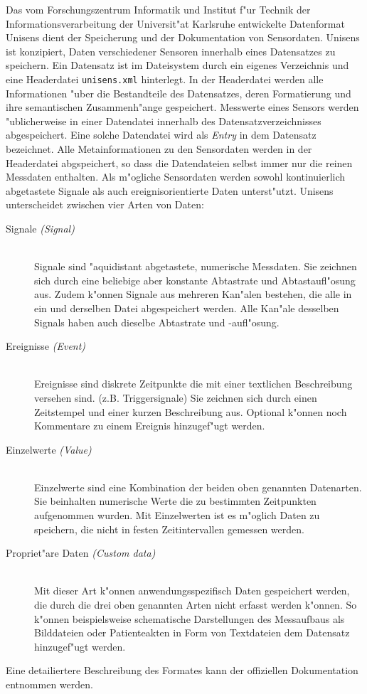 Das vom Forschungszentrum Informatik und Institut f"ur Technik der Informationsverarbeitung der Universit"at Karlsruhe entwickelte Datenformat Unisens dient der Speicherung und der Dokumentation von Sensordaten.
Unisens ist konzipiert, Daten verschiedener Sensoren innerhalb eines Datensatzes zu speichern.
Ein Datensatz ist im Dateisystem durch ein eigenes Verzeichnis und eine Headerdatei \verb|unisens.xml| hinterlegt.
In der Headerdatei werden alle Informationen "uber die Bestandteile des Datensatzes, deren Formatierung und ihre semantischen Zusammenh"ange gespeichert.
Messwerte eines Sensors werden "ublicherweise in einer Datendatei innerhalb des Datensatzverzeichnisses abgespeichert.
Eine solche Datendatei wird als \emph{Entry} in dem Datensatz bezeichnet.
Alle Metainformationen zu den Sensordaten werden in der Headerdatei abgspeichert, so dass die Datendateien selbst immer nur die reinen Messdaten enthalten.
Als m"ogliche Sensordaten werden sowohl kontinuierlich abgetastete Signale als auch ereignisorientierte Daten unterst"utzt.
Unisens unterscheidet zwischen vier Arten von Daten:
\begin{description}
	\item[Signale \emph{(Signal)}] \hfill \\
		Signale sind "aquidistant abgetastete, numerische Messdaten.
		Sie zeichnen sich durch eine beliebige aber konstante Abtastrate und Abtastaufl"osung aus.
		Zudem k"onnen Signale aus mehreren Kan"alen bestehen, die alle in ein und derselben Datei abgespeichert werden.
		Alle Kan"ale desselben Signals haben auch dieselbe Abtastrate und -aufl"osung.
	\item[Ereignisse \emph{(Event)}] \hfill \\
		Ereignisse sind diskrete Zeitpunkte die mit einer textlichen Beschreibung versehen sind. (z.B. Triggersignale)
		Sie zeichnen sich durch einen Zeitstempel und einer kurzen Beschreibung aus.
		Optional k"onnen noch Kommentare zu einem Ereignis hinzugef"ugt werden.
	\item[Einzelwerte \emph{(Value)}] \hfill \\
		Einzelwerte sind eine Kombination der beiden oben genannten Datenarten.
		Sie beinhalten numerische Werte die zu bestimmten Zeitpunkten aufgenommen wurden.
		Mit Einzelwerten ist es m"oglich Daten zu speichern, die nicht in festen Zeitintervallen gemessen werden.
	\item[Propriet"are Daten \emph{(Custom data)}] \hfill \\
		Mit dieser Art k"onnen anwendungsspezifisch Daten gespeichert werden, die durch die drei oben genannten Arten nicht erfasst werden k"onnen.
		So k"onnen beispielsweise schematische Darstellungen des Messaufbaus als Bilddateien oder Patienteakten in Form von Textdateien dem Datensatz hinzugef"ugt werden.
\end{description}
Eine detailiertere Beschreibung des Formates kann der offiziellen Dokumentation \cite{Ottenbacher2010} entnommen werden.

